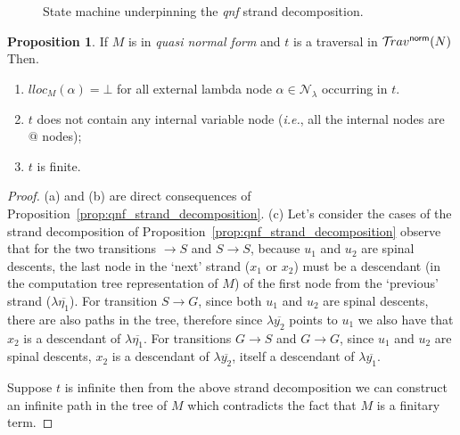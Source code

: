 \documentclass{article}
\makeatletter
\theoremstyle{definition}
\newtheorem{proposition}{Proposition}[section]
\newcommand\Nodes{\mathcal{N}}%
\newcommand\NodesLmd{\Nodes_\lambda}%
\newcommand{\ghostlmd}{{\lambda\!\!\lambda}}
\newcommand{\normalizing}{{\sf norm}}
\newcommand{\travsetnorm}{\travset^\normalizing}
\renewcommand\ie{{\it i.e.\@\xspace}}
\makeatother
\begin{document}
\begin{figure}[htbp]
\centering
{}
\caption{State machine underpinning the \emph{qnf} strand decomposition.}
\label{fig:qnf_strand_decomposition_statemachine}
\end{figure}



\begin{proposition}
\label{prop:qnf_traversals_are_finite}
If $M$ is in \emph{quasi normal form} and $t$ is a traversal in $\travsetnorm(N)$ Then.
\begin{enumerate}[label=(\alph*)]
\item $lloc_M(\alpha) = \bot$ for all external lambda node $\alpha \in \NodesLmd$ occurring in $t$.
\item $t$ does not contain any internal variable node (\ie, all the internal nodes are $@$ nodes);
\item $t$ is finite.
\end{enumerate}
\end{proposition}
\begin{proof}
(a) and (b) are direct consequences of Proposition~\ref{prop:qnf_strand_decomposition}.
(c) Let's consider the cases of the strand decomposition of Proposition~\ref{prop:qnf_strand_decomposition}
observe that for the two transitions $\rightarrow S$ and $S \rightarrow S$, because $u_1$ and $u_2$ are spinal descents, the last node in the `next' strand ($x_1$ or $x_2$) must be a descendant (in the computation tree representation of $M$) of the first node from the `previous' strand ($\lambda\overline{\eta_1}$).
For transition $S\rightarrow G$, since both $u_1$ and $u_2$ are spinal descents, there are also paths in the tree, therefore since $\lambda\overline{y_2}$ points to $u_1$ we also have that $x_2$ is a descendant of $\lambda\overline{\eta_1}$. For transitions
$G \rightarrow S$ and $G \rightarrow G$, since $u_1$ and $u_2$ are spinal descents, $x_2$ is a descendant of $\lambda\overline{y_2}$, itself a descendant of $\lambda\overline{y_1}$.

Suppose $t$ is infinite then from the above strand decomposition we can construct an infinite path in the tree of $M$ which contradicts the fact that $M$ is a finitary term.
\end{proof}
\end{document}
